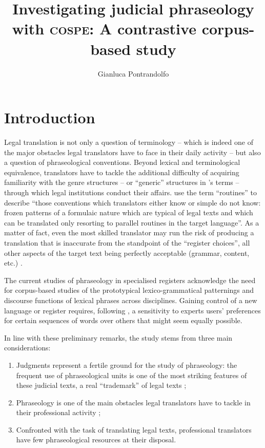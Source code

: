 \documentclass[output=paper]{LSP/langsci}
\author{Gianluca Pontrandolfo}
\title{Investigating judicial phraseology with \textsc{cospe}: A contrastive corpus-based study}
\begin{document}
\section{Introduction}
 Legal translation is not only a question of terminology – which is indeed one of the major obstacles legal translators have to face in their daily activity – but also a question of phraseological conventions. Beyond lexical and terminological equivalence, translators have to tackle the additional difficulty of acquiring familiarity with the genre structures – or “generic” structures in \citeauthor{Hasan1978}'s \citeyear{Hasan1978} terms – through which legal institutions conduct their affairs. \citet[190]{Hatim1990} use the term “routines” to describe “those conventions which translators either know or simple do not know: frozen patterns of a formulaic nature which are typical of legal texts and which can be translated only resorting to parallel routines in the target language”. As a matter of fact, even the most skilled translator may run the risk of producing a translation that is inaccurate from the standpoint of the “register choices”, all other aspects of the target text being perfectly acceptable (grammar, content, etc.) \citep[see][218-219]{Garzone2007}.
 
The current studies of phraseology in specialised registers acknowledge the need for corpus-based studies of the prototypical lexico-grammatical patternings and discourse functions of lexical phrases across disciplines. Gaining control of a new language or register requires, following \citet[5]{Hyland2008}, a sensitivity to experts users’ preferences for certain sequences of words over others that might seem equally possible.
 
In line with these preliminary remarks, the study stems from three main considerations:

\begin{enumerate}
\item Judgments represent a fertile ground for the study of phraseology: the frequent use of phraseological units is one of the most striking features of these judicial texts, a real “trademark” of legal texts \citep[154]{Mortara2001};
\item Phraseology is one of the main obstacles legal translators have to tackle in their professional activity \citep[see][]{Garzone2007,Kjaer2007};
\item Confronted with the task of translating legal texts, professional translators have few phraseological resources at their disposal.
\end{enumerate}
\end{document}
